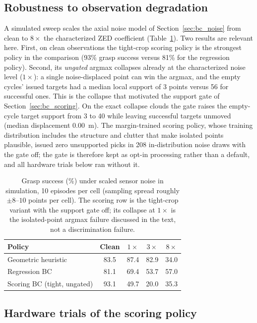 \subsection{Robustness to observation degradation}
\label{sec:bc_noise_sweep}

A simulated sweep scales the axial noise model of
Section~\ref{sec:bc_noise} from clean to $8\times$ the characterized ZED
coefficient (Table~\ref{tab:bc_noise_sweep}). Two results are relevant here.
First, on clean observations the tight-crop scoring policy is the strongest
policy in the comparison (93\% grasp success versus 81\% for the regression
policy). Second, its \emph{ungated} argmax collapses already at the
characterized noise level ($1\times$): a single noise-displaced point can win
the argmax, and the empty cycles' issued targets had a median local support
of 3 points versus 56 for successful ones. This is the collapse that
motivated the support gate of Section~\ref{sec:bc_scoring}. On the exact
collapse clouds the gate raises the empty-cycle target support from 3 to 40
while leaving successful targets unmoved (median displacement 0.00~m). The
margin-trained scoring policy, whose training distribution includes the
structure and clutter that make isolated points plausible, issued zero
unsupported picks in 208 in-distribution noise draws with the gate off; the
gate is therefore kept as opt-in processing rather than a default, and all
hardware trials below ran without it.

\begin{table}[t]
\centering
\caption{Grasp success (\%) under scaled sensor noise in simulation, 10
episodes per cell (sampling spread roughly $\pm 8$--$10$ points per cell).
The scoring row is the tight-crop variant with the support gate off; its
collapse at $1\times$ is the isolated-point argmax failure discussed in the
text, not a discrimination failure.}
\label{tab:bc_noise_sweep}
\begin{tabular}{lcccc}
\hline
\textbf{Policy} & \textbf{Clean} & $1\times$ & $3\times$ & $8\times$ \\
\hline
Geometric heuristic       & 83.5 & 87.4 & 82.9 & 34.0 \\
Regression BC             & 81.1 & 69.4 & 53.7 & 57.0 \\
Scoring BC (tight, ungated) & 93.1 & 49.7 & 20.0 & 35.3 \\
\hline
\end{tabular}
\end{table}

\subsection{Hardware trials of the scoring policy}
\label{sec:bc_scoring_trials}

